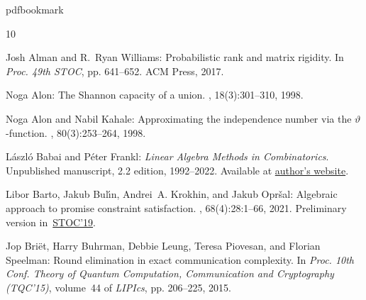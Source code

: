 \newcommand{\prelim}{Preliminary version in\ }\newcommand{\prelims}{Preliminary
  versions in\ }
\providecommand{\bibhead}[1]{}
\expandafter\ifx\csname pdfbookmark\endcsname\relax%
  \providecommand{\tocrefpdfbookmark}{}
\else\providecommand{\tocrefpdfbookmark}{%
   \hypertarget{tocreferences}{}%
   \pdfbookmark[1]{References}{tocreferences}}%
\fi

\tocrefpdfbookmark
\begin{thebibliography}{10}

\bibhead{AlmanW17}
{\sc Josh Alman and R.~Ryan Williams}: Probabilistic rank and matrix rigidity.
\newblock In {\em Proc. 49th STOC}, pp. 641--652. ACM Press, 2017.
\newblock [\epfmtdoi{10.1145/3055399.3055484}]

\bibhead{AlonUnion98}
{\sc Noga Alon}: The {S}hannon capacity of a union.
, 18(3):301--310, 1998.
\newblock [\epfmtdoi{10.1007/PL00009824}]

\bibhead{AlonK98}
{\sc Noga Alon and Nabil Kahale}: Approximating the independence number via the
  $\vartheta$-function.
, 80(3):253--264, 1998.
\newblock [\epfmtdoi{10.1007/BF01581168}]

\bibhead{BabaiF20}
{\sc L{\'{a}}szl{\'{o}} Babai and P{\'{e}}ter Frankl}: {\em Linear Algebra
  Methods in Combinatorics}.
\newblock Unpublished manuscript, 2.2 edition, 1992--2022.
\newblock Available at
  \href{https://people.cs.uchicago.edu/~laci/babai-frankl-book2022.pdf}{author's
  website}.

\bibhead{BartoBKO21}
{\sc Libor Barto, Jakub Bul{\'{\i}}n, Andrei~A. Krokhin, and Jakub Opr{\v
  s}al}: Algebraic approach to promise constraint satisfaction.
, 68(4):28:1--66, 2021.
\newblock \prelim \href{https:doi.org/10.1145/3313276.3316300}{STOC'19}.
\newblock [\epfmtdoi{10.1145/3457606}]

\bibhead{BrietBLPS15}
{\sc Jop Bri{\"{e}}t, Harry Buhrman, Debbie Leung, Teresa Piovesan, and Florian
  Speelman}: Round elimination in exact communication complexity.
\newblock In {\em Proc. 10th Conf. Theory of Quantum Computation, Communication
  and Cryptography {(TQC'15)}}, volume~44 of {\em LIPIcs}, pp. 206--225, 2015.


\end{thebibliography}
